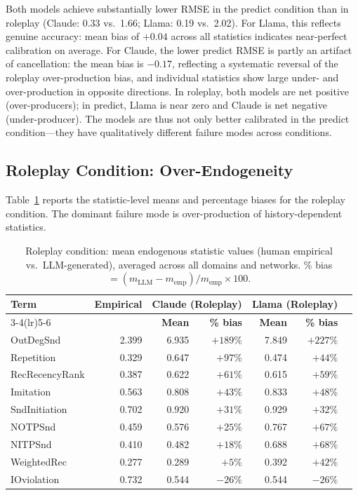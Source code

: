\documentclass[11pt]{article}
\begin{document}
Both models achieve substantially lower RMSE in the predict condition
than in roleplay (Claude: 0.33 vs.\ 1.66; Llama: 0.19 vs.\ 2.02). For
Llama, this reflects genuine accuracy: mean bias of $+0.04$ across all
statistics indicates near-perfect calibration on average. For Claude,
the lower predict RMSE is partly an artifact of cancellation: the mean
bias is $-0.17$, reflecting a systematic reversal of the roleplay
over-production bias, and individual statistics show large under- and
over-production in opposite directions. In roleplay, both models are
net positive (over-producers); in predict, Llama is near zero and
Claude is net negative (under-producer). The models are thus not only
better calibrated in the predict condition---they have qualitatively
different failure modes across conditions.

\subsection{Roleplay Condition: Over-Endogeneity}

Table~\ref{tab:roleplay} reports the statistic-level means and percentage
biases for the roleplay condition. The dominant failure mode is
over-production of history-dependent statistics.

\begin{table}[H]
\centering
\caption{Roleplay condition: mean endogenous statistic values (human empirical
vs.\ LLM-generated), averaged across all domains and networks.
\% bias $= (m_{\text{LLM}} - m_{\text{emp}})/m_{\text{emp}}\times 100$.}
\label{tab:roleplay}
\begin{tabular}{lrrrrrr}
\toprule
\multirow{2}{*}{\textbf{Term}} &
\multirow{2}{*}{\textbf{Empirical}} &
\multicolumn{2}{c}{\textbf{Claude (Roleplay)}} &
\multicolumn{2}{c}{\textbf{Llama (Roleplay)}} \\
\cmidrule(lr){3-4}\cmidrule(lr){5-6}
& & \textbf{Mean} & \textbf{\% bias} & \textbf{Mean} & \textbf{\% bias} \\
\midrule
OutDegSnd      & 2.399 & 6.935 & $+189\%$ & 7.849 & $+227\%$ \\
Repetition     & 0.329 & 0.647 & $+97\%$  & 0.474 & $+44\%$  \\
RecRecencyRank & 0.387 & 0.622 & $+61\%$  & 0.615 & $+59\%$  \\
Imitation      & 0.563 & 0.808 & $+43\%$  & 0.833 & $+48\%$  \\
SndInitiation  & 0.702 & 0.920 & $+31\%$  & 0.929 & $+32\%$  \\
NOTPSnd        & 0.459 & 0.576 & $+25\%$  & 0.767 & $+67\%$  \\
NITPSnd        & 0.410 & 0.482 & $+18\%$  & 0.688 & $+68\%$  \\
WeightedRec    & 0.277 & 0.289 & $+5\%$   & 0.392 & $+42\%$  \\
IOviolation    & 0.732 & 0.544 & $-26\%$  & 0.544 & $-26\%$  \\
\bottomrule
\end{tabular}
\end{table}
\end{document}

